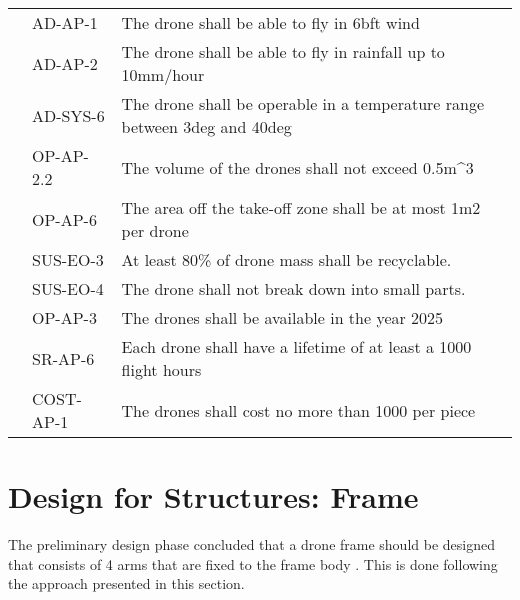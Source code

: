 \begin{table}[H]
\begin{scriptsize}
\begin{tabular}{|p{2cm}|p{2cm}|p{10cm}|}
                          & AD-AP-1       & The drone shall be able to fly in 6bft wind                                                                                  \\\cline{2-3} 
                          & AD-AP-2       & The drone shall be able to fly in rainfall up to 10mm/hour                                                                   \\\cline{2-3} 
                          & AD-SYS-6      & The drone shall be operable in a temperature range between 3deg and 40deg                                                    \\\cline{2-3} 
                          & OP-AP-2.2     & The volume of the drones shall not exceed 0.5m\textasciicircum{}3                                                            \\\cline{2-3} 
                          & OP-AP-6       & The area off the take-off zone shall be at most 1m2 per drone                                                                \\\cline{2-3} 
                          & SUS-EO-3      & At least 80\% of drone mass shall be recyclable.                                                                             \\\cline{2-3} 
                          & SUS-EO-4      & The drone shall not break down into small parts.                                                                             \\\cline{2-3} 
                          & OP-AP-3       & The drones shall be available in the year 2025  \\ \cline{2-3}
                          & SR-AP-6 & Each drone shall have a lifetime of at least a 1000 flight hours \\ \cline{2-3}
                          & COST-AP-1 & The drones shall cost no more than 1000\EUR{} per piece\\ \hline
\end{tabular}%

\end{scriptsize}
\end{table}


\section{Design for Structures: Frame}
\label{sec:struccalc}
The preliminary design phase concluded that a drone frame should be designed that consists of 4 arms that are fixed to the frame body \cite{midterm}. This is done following the approach presented in this section.

